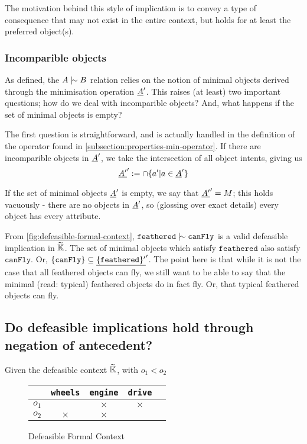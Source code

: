 \documentclass[11pt]{article}
\begin{document}
The motivation behind this style of implication is to convey a type of consequence that may not exist in the entire context, but holds for at least the preferred object(s).

\subsubsection{Incomparible objects}

As defined, the $A \twiddle B$ relation relies on the notion of minimal objects derived through the minimisation operation $\underline{A}'$. This raises (at least) two important questions; how do we deal with incomparible objects? And, what happens if the set of minimal objects is empty?

The first question is straightforward, and is actually handled in the definition of the operator found in \autoref{subsection:properties-min-operator}. If there are incomparible objects in $\underline{A}'$, we take the intersection of all object intents, giving us
\[\underline{A'}' := \cap \{a' | a \in \underline{A}'\}\]

If the set of minimal objects $\underline{A}'$ is empty, we say that $\underline{A'}' = M$; this holds vacuously - there are no objects in $\underline{A}'$, so (glossing over exact details) every object has every attribute.

From \autoref{fig:defeasible-formal-context}, $\texttt{feathered} \twiddle \texttt{canFly}$ is a valid defeasible implication in $\widetilde{\mathbb{K}}$. The set of minimal objects which satisfy $\texttt{feathered}$ also satisfy $\texttt{canFly}$. Or, $\{\texttt{canFly}\} \subseteq \underline{\{\texttt{feathered}\}'}'$. The point here is that while it is not the case that all feathered objects can fly, we still want to be able to say that the minimal (read: typical) feathered objects do in fact fly. Or, that typical feathered objects can fly.

\subsection{Do defeasible implications hold through negation of antecedent?}
Given the defeasible context $\widetilde{\mathbb{K}}$, with $o_1 < o_2$

\begin{figure}[h]
  \begin{center}
    \begin{tabular}{r|cccc}
            & \texttt{wheels} & \texttt{engine} & \texttt{drive} \\ \hline
      $o_1$ &                 & $\times$        & $\times$       \\
      $o_2$ & $\times$        & $\times$        &                \\
    \end{tabular}
  \end{center}
  \caption{Defeasible Formal Context}
  \label{fig:small-defeasible-context}
\end{figure}
\end{document}
